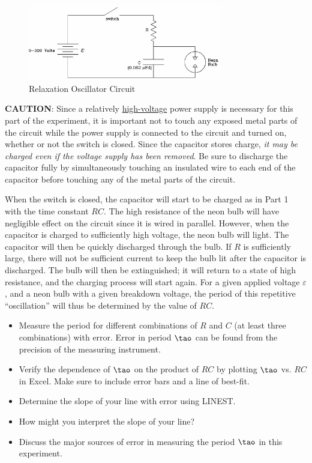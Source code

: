 \begin{figure}[h]
    \begin{center}
        \includegraphics[width=0.75\textwidth]{./Exp4/pic/image8.png}
    \end{center}
    \caption{Relaxation Oscillator Circuit}
    \label{fig:relaxcirc}
\end{figure}

\textbf{CAUTION}: Since a relatively \underline{high-voltage} power supply is necessary for this part of the experiment, it is important not to touch any exposed metal parts of the circuit while the power supply is connected to the circuit and turned on, whether or not the switch is closed. Since the capacitor stores charge, \emph{it may be charged even if the voltage supply has been removed}. Be sure to discharge the capacitor fully by simultaneously touching an insulated wire to each end of the capacitor before touching any of the metal parts of the circuit.\myskip

When the switch is closed, the capacitor will start to be charged as in Part 1 with the time constant $RC$. The high resistance  of the neon bulb will have negligible effect on the circuit since it is wired in parallel. However, when the capacitor is charged to sufficiently high voltage, the neon bulb will light. The capacitor will then be quickly discharged through the bulb. If $R$ is sufficiently large, there will not be sufficient current to keep the bulb lit after the capacitor is discharged. The bulb will then be extinguished; it will return to a state of high resistance, and the charging process will start again. For a given applied voltage $\varepsilon$, and a neon bulb with a given breakdown voltage, the period of this repetitive ``oscillation'' will thus be determined by the value of $RC$.\myskip
\begin{itemize}
  \item Measure the period for different combinations of $R$ and $C$ (at least three combinations) with error. Error in period $\tao$ can be found from the precision of the measuring instrument.
  \item Verify the dependence of $\tao$ on the product of $RC$ by plotting $\tao$ vs. $RC$ in Excel. Make sure to include error bars and a line of best-fit.
  \item Determine the slope of your line with error using LINEST.
  \item How might you interpret the slope of your line?
  \item Discuss the major sources of error in measuring the period $\tao$ in this experiment.
\end{itemize}
